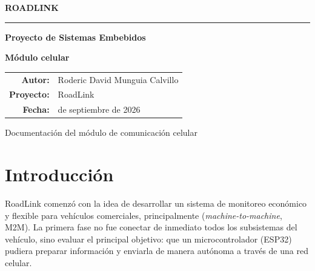 \documentclass[11pt,letterpaper]{article}
\begin{document}
\begin{titlepage}
  \pagecolor{RoadLight}
  \begin{center}
    \vspace*{1.0cm}
    {\sffamily\bfseries\fontsize{20}{24}\selectfont\color{RoadTeal} ROADLINK}\par
    \vspace{0.35cm}
    {\color{RoadTeal}\rule{0.82\textwidth}{2.2pt}}\par
    \vfill
    {\sffamily\bfseries\fontsize{28}{34}\selectfont\color{RoadGreen} Proyecto de Sistemas Embebidos}\par
    \vspace{0.35cm}
    {\sffamily\bfseries\fontsize{38}{44}\selectfont\color{RoadBlue} Módulo celular}\par
    \vspace{0.8cm}
    \vfill
    \begin{tabular}{>{\sffamily\bfseries}r >{\sffamily}l}
      Autor: & Roderic David Munguia Calvillo \\
      Proyecto: & RoadLink \\
      Fecha: & 15 de septiembre de 2026 \\
    \end{tabular}
    \vfill
    \begin{minipage}{0.82\textwidth}
      \centering
      \colorbox{RoadGreen}{\parbox{0.94\textwidth}{\centering\color{white}\sffamily\small
        Documentación del módulo de comunicación celular}}
    \end{minipage}
    \vspace*{0.8cm}
  \end{center}
\end{titlepage}
\nopagecolor

\tableofcontents
\clearpage
{}

\section{Introducción}

RoadLink comenzó con la idea de desarrollar un sistema de monitoreo económico y flexible para vehículos comerciales, principalmente
(\textit{machine-to-machine}, M2M). La primera fase no fue conectar de inmediato
todos los subsistemas del vehículo, sino evaluar el principal objetivo: que un
microcontrolador (ESP32) pudiera preparar información y enviarla de manera autónoma a
través de una red celular.
\end{document}
